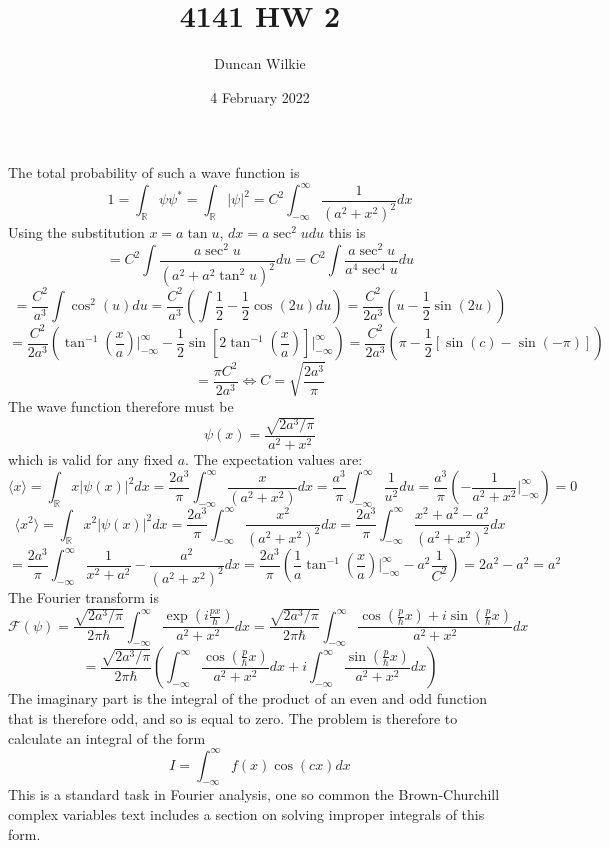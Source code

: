 \documentclass{article}
\title{4141 HW 2}
\author{Duncan Wilkie}
\date{4 February 2022}
\begin{document}
\maketitle

\section{}
The total probability of such a wave function is
\[1=\int_\mathbb{R}\psi\psi^*=\int_\mathbb{R}|\psi|^2=C^2\int_{-\infty}^\infty\frac{1}{(a^2+x^2)^2}dx\]
Using the substitution $x=a\tan u$, $dx=a\sec^2u du$ this is
\[=C^2\int\frac{a\sec^2u}{(a^2+a^2\tan^2u)^2}du=C^2\int\frac{a\sec^2u}{a^4\sec^4u}du\]
\[=\frac{C^2}{a^3}\int \cos^2(u)du=\frac{C^2}{a^3}\left( \int \frac{1}{2}-\frac{1}{2}\cos(2u) du\right)=\frac{C^2}{2a^3}\left(u-\frac{1}{2}\sin(2u)  \right)\]\[=\frac{C^2}{2a^3}\left( \tan^{-1}\left( \frac{x}{a} \right)\bigg|_{-\infty}^\infty-\frac{1}{2}\sin\left[ 2\tan^{-1}\left(  \frac{x}{a}\right)\right]\bigg|_{-\infty}^\infty \right)=\frac{C^2}{2a^3}\left( \pi-\frac{1}{2}\left[ \sin\left( c \right) -\sin\left( {-\pi} \right)\right] \right)\]
\[=\frac{\pi C^2}{2a^3}\Leftrightarrow C=\sqrt{\frac{2a^3}{\pi}}\]
The wave function therefore must be
\[\psi(x)=\frac{\sqrt{2a^3/\pi}}{a^2+x^2}\]
which is valid for any fixed $a$.
The expectation values are:
\[\langle x \rangle=\int_\mathbb{R}x|\psi(x)|^2dx=\frac{2a^3}{\pi}\int_{-\infty}^\infty\frac{x}{(a^2+x^2)}dx=\frac{a^3}{\pi}\int_{-\infty}^\infty\frac{1}{u^2}du=\frac{a^3}{\pi}\left( -\frac{1}{a^2+x^2}\bigg|_{-\infty}^\infty \right)=0\]
\[\langle x^2 \rangle=\int_\mathbb{R}x^2|\psi(x)|^2dx=\frac{2a^3}{\pi}\int_{-\infty}^\infty\frac{x^2}{(a^2+x^2)^2}dx=\frac{2a^3}{\pi}\int_{-\infty}^\infty\frac{x^2+a^2-a^2}{(a^2+x^2)^2}dx\]
\[=\frac{2a^3}{\pi}\int_{-\infty}^\infty\frac{1}{x^2+a^2}-\frac{a^2}{(a^2+x^2)^2}dx=\frac{2a^3}{\pi}\left( \frac{1}{a}\tan^{-1}\left( \frac{x}{a} \right)\bigg|_{-\infty}^\infty-a^2\frac{1}{C^2}\right)=2a^2-a^2=a^2\]
The Fourier transform is
\[\mathcal{F}(\psi)=\frac{\sqrt{2a^3/\pi}}{2\pi \hbar}\int_{-\infty}^\infty\frac{\exp\left( i\frac{px}{\hbar} \right)}{a^2+x^2}dx=\frac{\sqrt{2a^3/\pi}}{2\pi\hbar}\int_{-\infty}^\infty\frac{\cos\left(\frac{p}{\hbar}x \right)+i\sin\left( \frac{p}{\hbar}x \right)}{a^2+x^2}dx\]
\[=\frac{\sqrt{2a^3/\pi}}{2\pi\hbar}\left( \int_{-\infty}^\infty\frac{\cos\left( \frac{p}{\hbar}x \right)}{a^2+x^2}dx +i\int_{-\infty}^\infty\frac{\sin\left( \frac{p}{\hbar}x \right)}{a^2+x^2}dx\right)\]
The imaginary part is the integral of the product of an even and odd function that is therefore odd, and so is equal to zero. The problem is therefore to calculate an integral of the form
\[I=\int_{-\infty}^\infty f(x)\cos(cx)dx\]
This is a standard task in Fourier analysis, one so common the Brown-Churchill complex variables text includes a section on solving improper integrals of this form.
\end{document}
